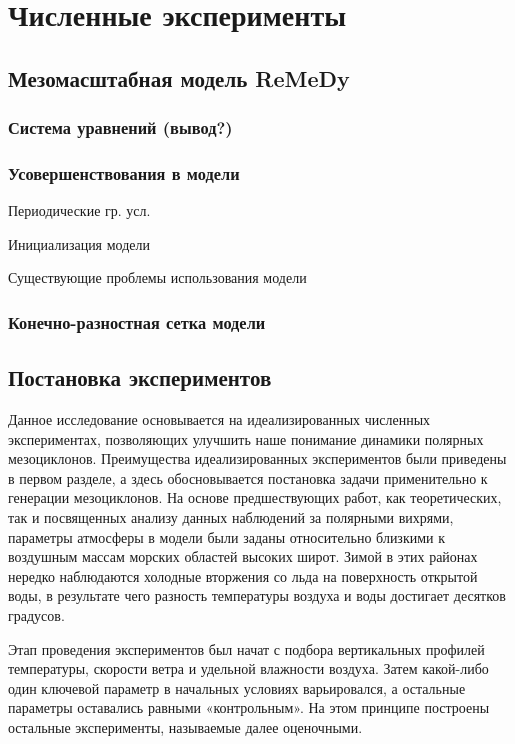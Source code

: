 \documentclass[12pt,a4paper]{report}
\begin{document}
\setcounter{chapter}{3}
\chapter{Численные эксперименты}
\section{Мезомасштабная модель ReMeDy}
\subsection{Система уравнений (вывод?)}
\subsection{Усовершенствования в модели}
\begin{sqlist}
\item Периодические гр. усл.
\item Инициализация модели
\item Существующие проблемы использования модели
\end{sqlist}

\subsection{Конечно-разностная сетка модели}

\section{Постановка экспериментов}
\label{sec:expsetup}
Данное исследование основывается на идеализированных численных экспериментах, позволяющих улучшить наше понимание динамики полярных мезоциклонов. Преимущества идеализированных экспериментов были приведены в первом разделе, а здесь обосновывается постановка задачи применительно к генерации мезоциклонов.
На основе предшествующих работ, как теоретических, так и посвященных анализу данных наблюдений за полярными вихрями, параметры атмосферы в модели были заданы относительно близкими к воздушным массам морских областей высоких широт. Зимой в этих районах нередко наблюдаются холодные вторжения со льда на поверхность открытой воды, в результате чего разность температуры воздуха и воды  достигает десятков градусов.

Этап проведения экспериментов был начат с подбора вертикальных профилей температуры, скорости ветра и удельной влажности воздуха. Затем какой-либо один ключевой параметр в начальных условиях варьировался, а остальные параметры оставались равными «контрольным». На этом принципе построены остальные эксперименты, называемые далее оценочными.
\end{document}
